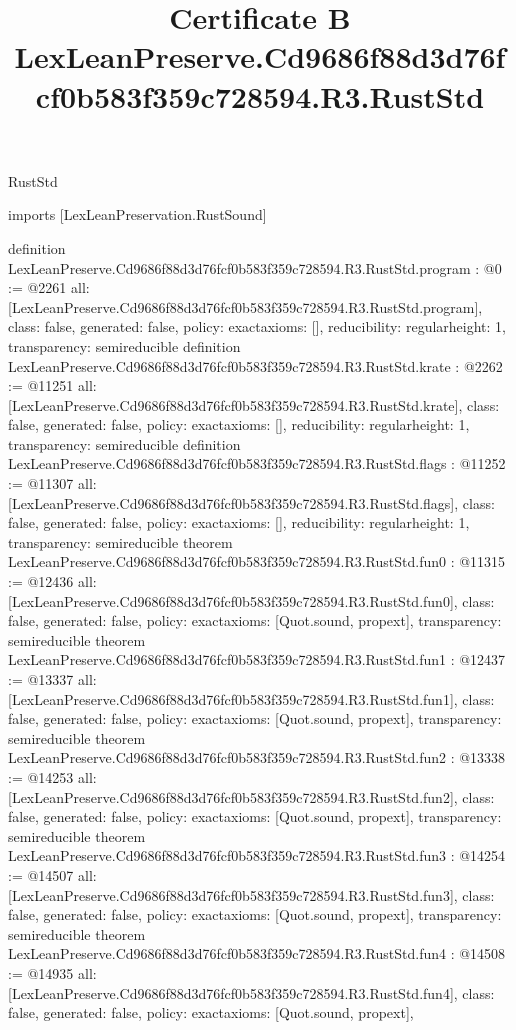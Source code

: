 \begin{lexlean}{RustStd}
\title{Certificate B LexLeanPreserve.Cd9686f88d3d76fcf0b583f359c728594.R3.RustStd}
\begin{coremodule}
imports [LexLeanPreservation.RustSound]

definition LexLeanPreserve.Cd9686f88d3d76fcf0b583f359c728594.R3.RustStd.program : @0 := @2261 {
  all: [LexLeanPreserve.Cd9686f88d3d76fcf0b583f359c728594.R3.RustStd.program],
  class: false,
  generated: false,
  policy: exact{axioms: []},
  reducibility: regular{height: 1},
  transparency: semireducible
}
definition LexLeanPreserve.Cd9686f88d3d76fcf0b583f359c728594.R3.RustStd.krate : @2262 := @11251 {
  all: [LexLeanPreserve.Cd9686f88d3d76fcf0b583f359c728594.R3.RustStd.krate],
  class: false,
  generated: false,
  policy: exact{axioms: []},
  reducibility: regular{height: 1},
  transparency: semireducible
}
definition LexLeanPreserve.Cd9686f88d3d76fcf0b583f359c728594.R3.RustStd.flags : @11252 := @11307 {
  all: [LexLeanPreserve.Cd9686f88d3d76fcf0b583f359c728594.R3.RustStd.flags],
  class: false,
  generated: false,
  policy: exact{axioms: []},
  reducibility: regular{height: 1},
  transparency: semireducible
}
theorem LexLeanPreserve.Cd9686f88d3d76fcf0b583f359c728594.R3.RustStd.fun0 : @11315 := @12436 {
  all: [LexLeanPreserve.Cd9686f88d3d76fcf0b583f359c728594.R3.RustStd.fun0],
  class: false,
  generated: false,
  policy: exact{axioms: [Quot.sound, propext]},
  transparency: semireducible
}
theorem LexLeanPreserve.Cd9686f88d3d76fcf0b583f359c728594.R3.RustStd.fun1 : @12437 := @13337 {
  all: [LexLeanPreserve.Cd9686f88d3d76fcf0b583f359c728594.R3.RustStd.fun1],
  class: false,
  generated: false,
  policy: exact{axioms: [Quot.sound, propext]},
  transparency: semireducible
}
theorem LexLeanPreserve.Cd9686f88d3d76fcf0b583f359c728594.R3.RustStd.fun2 : @13338 := @14253 {
  all: [LexLeanPreserve.Cd9686f88d3d76fcf0b583f359c728594.R3.RustStd.fun2],
  class: false,
  generated: false,
  policy: exact{axioms: [Quot.sound, propext]},
  transparency: semireducible
}
theorem LexLeanPreserve.Cd9686f88d3d76fcf0b583f359c728594.R3.RustStd.fun3 : @14254 := @14507 {
  all: [LexLeanPreserve.Cd9686f88d3d76fcf0b583f359c728594.R3.RustStd.fun3],
  class: false,
  generated: false,
  policy: exact{axioms: [Quot.sound, propext]},
  transparency: semireducible
}
theorem LexLeanPreserve.Cd9686f88d3d76fcf0b583f359c728594.R3.RustStd.fun4 : @14508 := @14935 {
  all: [LexLeanPreserve.Cd9686f88d3d76fcf0b583f359c728594.R3.RustStd.fun4],
  class: false,
  generated: false,
  policy: exact{axioms: [Quot.sound, propext]},
}
\end{coremodule}
\end{lexlean}
